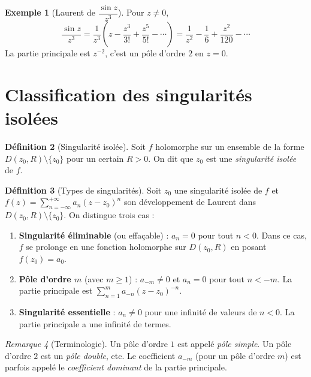 \documentclass[12pt,a4paper,openany]{book}
\theoremstyle{definition}
\newtheorem{definition}{Définition}[chapter]
\newtheorem{exemple}[definition]{Exemple}
\theoremstyle{plain}
\theoremstyle{remark}
\newtheorem{remarque}[definition]{Remarque}
\begin{document}
\begin{exemple}[Laurent de $\dfrac{\sin z}{z^3}$]\label{ex:laurent-sinz/z3}
Pour $z \neq 0$,
\[
  \frac{\sin z}{z^3} = \frac{1}{z^3}\left(z - \frac{z^3}{3!}
  + \frac{z^5}{5!} - \cdots\right)
  = \frac{1}{z^2} - \frac{1}{6} + \frac{z^2}{120} - \cdots
\]
La partie principale est $z^{-2}$, c'est un pôle d'ordre $2$ en $z = 0$.
\end{exemple}

\section{Classification des singularités isolées}

\begin{definition}[Singularité isolée]\label{def:isolated-sing}
Soit $f$ holomorphe sur un ensemble de la forme $D(z_0, R)\setminus\{z_0\}$
pour un certain $R > 0$. On dit que $z_0$ est une \emph{singularité isolée}
de $f$.
\end{definition}

\begin{definition}[Types de singularités]\label{def:sing-types}
Soit $z_0$ une singularité isolée de $f$ et
$f(z) = \sum_{n=-\infty}^{+\infty} a_n(z-z_0)^n$ son développement
de Laurent dans $D(z_0,R)\setminus\{z_0\}$. On distingue trois cas :
\begin{enumerate}[label=\textbf{(\roman*)}]
  \item \textbf{Singularité éliminable} (ou effaçable) : $a_n = 0$
        pour tout $n < 0$. Dans ce cas, $f$ se prolonge en une fonction
        holomorphe sur $D(z_0,R)$ en posant $f(z_0) = a_0$.
  \item \textbf{Pôle d'ordre $m$} (avec $m \geq 1$) : $a_{-m} \neq 0$
        et $a_n = 0$ pour tout $n < -m$. La partie principale est
        $\sum_{n=1}^{m} a_{-n}(z-z_0)^{-n}$.
  \item \textbf{Singularité essentielle} : $a_n \neq 0$ pour une
        infinité de valeurs de $n < 0$. La partie principale a une
        infinité de termes.
\end{enumerate}
\end{definition}

\begin{remarque}[Terminologie]\label{rem:sing-terminology}
Un pôle d'ordre $1$ est appelé \emph{pôle simple}. Un pôle d'ordre $2$
est un \emph{pôle double}, etc. Le coefficient $a_{-m}$ (pour un pôle
d'ordre $m$) est parfois appelé le \emph{coefficient dominant} de la
partie principale.
\end{remarque}
\end{document}
